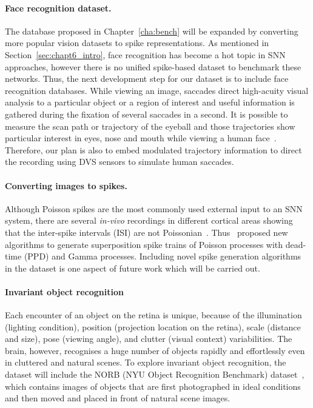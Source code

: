\paragraph{Face recognition dataset.}
The database proposed in Chapter~\ref{cha:bench} will be expanded by converting more popular vision datasets to spike representations.
As mentioned in Section~\ref{sec:chapt6_intro}, face recognition has become a hot topic in SNN approaches, however there is no unified spike-based dataset to benchmark these networks.
Thus, the next development step for our dataset is to include face recognition databases.
While viewing an image, saccades direct high-acuity visual analysis to a particular object or a region of interest and useful information is gathered during the fixation of several saccades in a second.
It is possible to measure the scan path or trajectory of the eyeball and those trajectories show particular interest in eyes, nose and mouth while viewing a human face~\citep{yarbus1967eye}.
Therefore, our plan is also to embed modulated trajectory information to direct the recording using DVS sensors to simulate human saccades.

\paragraph{Converting images to spikes.}
Although Poisson spikes are the most commonly used external input to an SNN system, there are several \textit{in-vivo} recordings in different cortical areas showing that the inter-spike intervals (ISI) are not Poissonian~\citet{deger2012statistical}. 
Thus~\citep{deger2012statistical} proposed new algorithms to generate superposition spike trains of Poisson processes with dead-time (PPD) and Gamma processes.
Including novel spike generation algorithms in the dataset is one aspect of future work which will be carried out.

\paragraph{Invariant object recognition}
Each encounter of an object on the retina is unique, because of the illumination (lighting condition), position (projection location on the retina), scale (distance and size), pose (viewing angle), and clutter (visual context) variabilities.
The brain, however, recognises a huge number of objects rapidly and effortlessly even in cluttered and natural scenes.
To explore invariant object recognition, the dataset will include the NORB (NYU Object Recognition Benchmark) dataset~\citep{lecun2004learning}, which contains images of objects that are first photographed in ideal conditions and then moved and placed in front of natural scene images.

